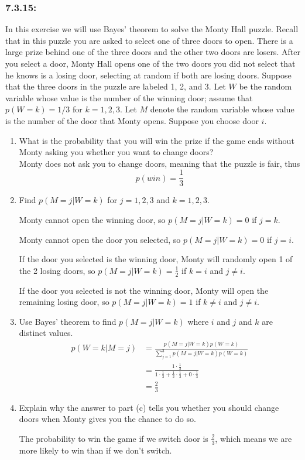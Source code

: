 \documentclass[a4paper]{article}
\begin{document}
	\subsubsection*{7.3.15:}
	In this exercise we will use Bayes' theorem to solve the Monty Hall puzzle. Recall that in this puzzle you are asked to select one of three doors to open. There is a large prize behind one of the three doors and the other two doors are losers. After you select a door, Monty Hall opens one of the two doors you did not select that he knows is a losing door, selecting at random if both are losing doors. Suppose that the three doors in the puzzle are labeled 1, 2, and 3. Let $W$ be the random variable whose value is the number of the winning door; assume that $p(W=k) = 1/3$ for $k=1,2,3$. Let $M$ denote the random variable whose value is the number of the door that Monty opens. Suppose you choose door $i$.
	\begin{enumerate}[label = \textbf{\alph*)}]
	    \item What is the probability that you will win the prize if the game ends without Monty asking you whether you want to change doors? \\
	    Monty does not ask you to change doors, meaning that the puzzle is fair, thus
	    \begin{equation*}
	    p(win) = \frac{1}{3}
	    \end{equation*}
	    \item Find $p(M=j|W=k)$ for $j=1,2,3$ and $k=1,2,3$.
	    
	    Monty cannot open the winning door, so $p(M=j|W=k) = 0$ if $j=k$.
	    
	    Monty cannot open the door you selected, so $p(M=j|W=k) = 0$ if $j=i$.
	    
	    If the door you selected is the winning door, Monty will randomly open 1 of the 2 losing doors, so $p(M=j|W=k) = \frac{1}{2}$ if $k=i$ and $j \neq i$.
	    
	    If the door you selected is not the winning door, Monty will open the remaining losing door, so $p(M=j|W=k) = 1$ if $k \neq i$ and $j \neq i$.
	    \item Use Bayes' theorem to find $p(M=j|W=k)$ where $i$ and $j$ and $k$ are distinct values.
	    \begin{align*}
	    p(W=k|M=j) & = \frac{p(M=j|W=k) p(W=k)}{\sum_{j=1}^{3}p(M=j|W=k) p(W=k)} \\
	    & = \frac{1 \cdot \frac{1}{3}}{1 \cdot \frac{1}{3} + \frac{1}{2} \cdot \frac{1}{3} + 0 \cdot \frac{1}{3}} \\
	    & = \frac{2}{3}
	    \end{align*}
	    \item Explain why the answer to part (c) tells you whether you should change doors when Monty gives you the chance to do so. 
	    
	    The probability to win the game if we switch door is $\frac{2}{3}$, which means we are more likely to win than if we don't switch.
	\end{enumerate}
	
\end{document}
